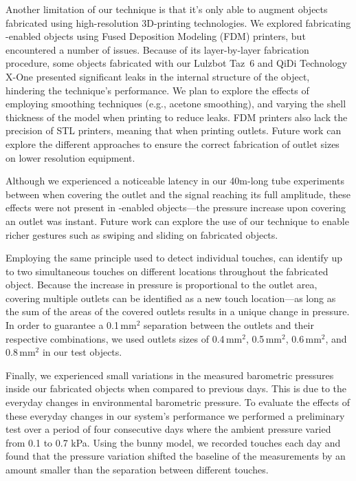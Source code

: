 		Another limitation of our technique is that it's only able to augment
		objects fabricated using high-resolution 3D-printing technologies. We
		explored fabricating \at-enabled objects using Fused Deposition Modeling
		(FDM) printers, but encountered a number of issues. Because of its
		layer-by-layer fabrication procedure, some objects fabricated with our
		Lulzbot Taz~6 and QiDi Technology X-One presented significant leaks in the
		internal structure of the object, hindering the technique's performance. We
		plan to explore the effects of employing smoothing techniques (e.g., acetone
		smoothing), and varying the shell thickness of the model when printing to
		reduce leaks. FDM printers also lack the precision of STL printers, meaning
		that when printing outlets. Future work can explore the different approaches
		to ensure the correct fabrication of outlet sizes on lower resolution
		equipment.
		
		Although we experienced a noticeable latency in our 40m-long tube
		experiments between when covering the outlet and the signal reaching its
		full amplitude, these effects were not present in \at-enabled objects---the
		pressure increase upon covering an outlet was instant. Future work can
		explore the use of our technique to enable richer gestures such as swiping
		and sliding on fabricated objects.
		
		Employing the same principle used to detect individual touches, \at can
		identify up to two simultaneous touches on different locations throughout
		the fabricated object. Because the increase in pressure is proportional to
		the outlet area, covering multiple outlets can be identified as a new touch
		location---as long as the sum of the areas of the covered outlets results in
		a unique change in pressure. In order to guarantee a 0.1\,mm$^2$ separation
		between the outlets and their respective combinations, we used outlets sizes
		of 0.4\,mm$^2$, 0.5\,mm$^2$, 0.6\,mm$^2$, and 0.8\,mm$^2$ in our test
		objects.
		
		Finally, we experienced small variations in the measured barometric
		pressures inside our fabricated objects when compared to previous days. This
		is due to the everyday changes in environmental barometric pressure. To
		evaluate the effects of these everyday changes in our system's performance
		we performed a preliminary test over a period of four consecutive days where
		the ambient pressure varied from 0.1 to 0.7 kPa. Using the bunny model, we
		recorded touches each day and found that the pressure variation shifted the
		baseline of the measurements by an amount smaller than the separation
		between different touches.
	    
